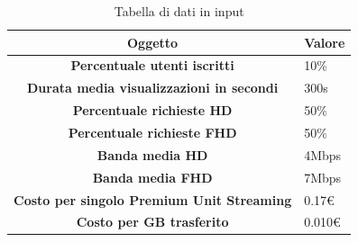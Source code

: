\begin{table}[H]
    \label{tab:dati-input}
    \begin{tabularx}{\textwidth}{|c|X|}
        \hline
        \textbf{Oggetto} & \textbf{Valore} \\\hline
        
        \textbf{Percentuale utenti iscritti} & {10\%} \\ 
        \hline
        \textbf{Durata media visualizzazioni in secondi} & {300s} \\ 
        \hline
        \textbf{Percentuale richieste HD} & {50\%}\\
        \hline
        \textbf{Percentuale richieste FHD} & {50\%}\\  
        \hline
        \textbf{Banda media HD} & {4Mbps}\\  
        \hline
        \textbf{Banda media FHD} & {7Mbps}\\  
        \hline
        \textbf{Costo per singolo Premium Unit Streaming} & {0.17€}\\  
        \hline
        \textbf{Costo per GB trasferito} & {0.010€}\\  
        \hline
    \end{tabularx}
    \caption{Tabella di dati in input}

\end{table}

